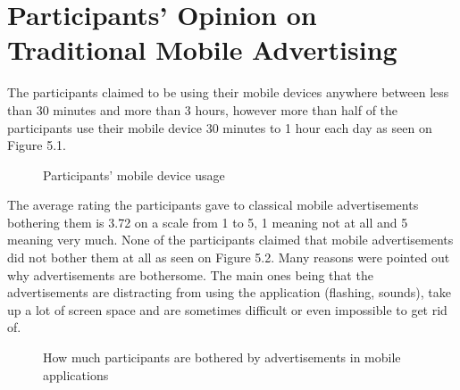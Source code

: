 \section{Participants' Opinion on Traditional Mobile Advertising}

The participants claimed to be using their mobile devices anywhere between less than 30 minutes and more than 3 hours, however more than half of the participants use their mobile device 30 minutes to 1 hour each day as seen on Figure 5.1.

\begin{figure}
\begin{center}
\caption{Participants' mobile device usage}
\end{center}
\end{figure}

The average rating the participants gave to classical mobile advertisements bothering them is 3.72 on a scale from 1 to 5, 1 meaning not at all and 5 meaning very much. None of the participants claimed that mobile advertisements did not bother them at all as seen on Figure 5.2. Many reasons were pointed out why advertisements are bothersome. The main ones being that the advertisements are distracting from using the application (flashing, sounds), take up a lot of screen space and are sometimes difficult or even impossible to get rid of.

\begin{figure}
\begin{center}
\caption{How much participants are bothered by advertisements in mobile applications}
\end{center}
\end{figure}

